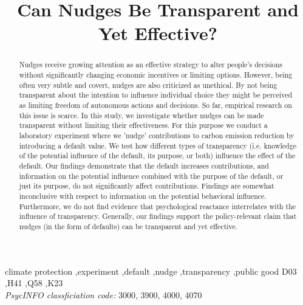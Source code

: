 \documentclass[review, authoryear,12pt]{elsarticle}
\begin{document}
\begin{frontmatter}



\title{Can Nudges Be Transparent and Yet Effective?}


\begin{abstract}
Nudges receive growing attention as an effective strategy to alter people's decisions without significantly changing economic incentives or limiting options. However, being often very subtle and covert, nudges are also criticized as unethical. By not being transparent about the intention to influence individual choice they might be perceived as limiting freedom of autonomous actions and decisions. So far, empirical research on this issue is scarce. In this study, we investigate whether nudges can be made transparent without limiting their effectiveness. For this purpose we conduct a laboratory experiment where we 'nudge' contributions to carbon emission reduction by introducing a default value. We test how different types of transparency (i.e. knowledge of the potential influence of the default, its purpose, or both) influence the effect of the default. Our findings demonstrate that the default increases contributions, and information on the potential influence combined with the purpose of the default, or just its purpose, do not significantly affect contributions. Findings are somewhat inconclusive with respect to information on the potential behavioral influence. Furthermore, we do not find evidence that psychological reactance interrelates with the influence of transparency. Generally, our findings support the policy-relevant claim that nudges (in the form of defaults) can be transparent and yet effective.
\end{abstract}

\begin{keyword}
climate protection \sep experiment \sep default \sep nudge \sep transparency \sep public good
\JEL D03 \sep H41 \sep Q58 \sep K23 \\
\textit{PsycINFO classficiation code:} 3000, 3900, 4000, 4070
\end{keyword}

\end{frontmatter}
\end{document}
